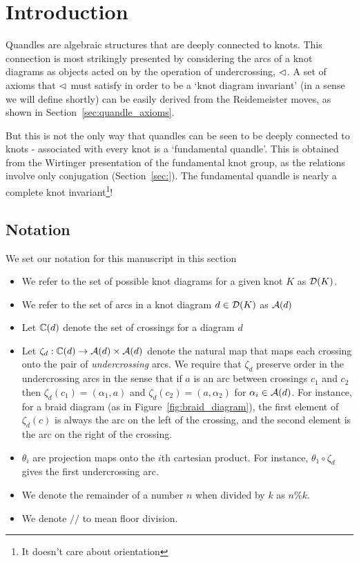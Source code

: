 \documentclass[paper.tex]{subfiles}
\begin{document}
\section{Introduction}
\label{sec:intro}

Quandles are algebraic structures that are deeply connected to knots. This connection is most strikingly presented by considering the arcs of a knot diagrams as objects acted on by the operation of
undercrossing, $\vartriangleleft$. A set of axioms that $\vartriangleleft$ must satisfy in order to be a `knot diagram invariant' (in a sense we will define shortly) can be easily derived from the Reidemeister moves, as shown in
Section~\ref{sec:quandle_axioms}.

But this is not the only way that quandles can be seen to be deeply connected to knots - associated with every knot is a `fundamental quandle'. This is obtained from the Wirtinger presentation of the fundamental knot group,
as the relations involve only conjugation (Section~\ref{sec:}). The fundamental quandle is nearly a complete knot invariant\footnote{It doesn't care about orientation}!


\subsection{Notation}

We set our notation for this manuscript in this section

\begin{itemize}
  \item We refer to the set of possible knot diagrams for a given knot $K$ as $\operatorname{\mathcal{D}}(K)$.
  \item We refer to the set of arcs in a knot diagram $d \in \operatorname{\mathcal{D}}(K)$ as $\mathcal{A}(d)$
  \item Let $\mathbb{C}(d)$ denote the set of crossings for a diagram $d$
  \item Let $\zeta_d: \mathbb{C}(d) \to \mathcal{A}(d) \times \mathcal{A}(d)$ denote the natural map that maps each crossing onto the pair of
    \emph{undercrossing} arcs. We require that $\zeta_d$ preserve order in the undercrossing arcs in the
    sense that if $a$ is an arc between crossings $c_1$ and $c_2$ then $\zeta_d(c_1) = (\alpha_1, a)$ and $\zeta_d(c_2) = (a, \alpha_2)$ for
    $\alpha_i \in \mathcal{A}(d)$. For instance, for a braid diagram (as in Figure~\ref{fig:braid_diagram}), the first element of $\zeta_d(c)$ is always the arc on the left of the crossing,
    and the second element is the arc on the right of the crossing.
  \item $\theta_i$ are projection maps onto the $i$th cartesian product. For instance, $\theta_1 \circ \zeta_d$ gives the first undercrossing arc.
  \item We denote the remainder of a number $n$ when divided by $k$ as $n\%k$.
  \item We denote $//$ to mean floor division.
\end{itemize}
\end{document}
